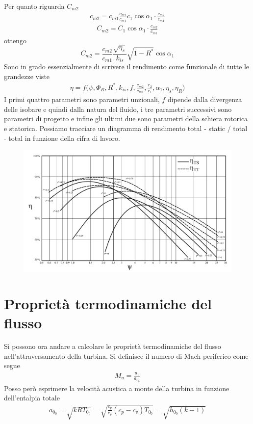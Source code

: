 Per quanto riguarda $C_{m2}$ 
\begin{align*}
c_{m2} = c_{m1} \frac{c_{m2}}{c_{m1}} c_1 \cos \alpha_1 \cdot \frac{c_{m2}}{c_{m1}}
\end{align*}
\begin{align*}
C_{m2} = C_1 \cos \alpha_1 \cdot \frac{c_{m2}}{c_{m1}}
\end{align*}
ottengo
\begin{equation}
\boxed{C_{m2} = \frac{c_{m2}}{c_{m1}} \frac{\sqrt{\eta_s}}{k_{is}} \sqrt{1 - R^*} \cos \alpha_1 }
\end{equation}
Sono in grado essenzialmente di scrivere il rendimento come funzionale di tutte le grandezze viste 
\begin{align*}
\eta = f \bigg( \psi, \Phi_R, R^*, k_{is}, f, \frac{c_{m2}}{c_{m1}}, \frac{r_2}{r_1}, \alpha_1, \eta_s, \eta_R \bigg)
\end{align*}
I primi quattro parametri sono parametri unzionali, $f$ dipende dalla divergenza delle isobare e quindi dalla natura del fluido, i tre parametri successivi sono parametri di progetto e infine gli ultimi due sono parametri della schiera rotorica e statorica.
Possiamo tracciare un diagramma di rendimento total - static / total - total in funzione della cifra di lavoro. 
\begin{figure}
\centering
  \includegraphics[width=.8\textwidth]{fig/Rendimenti_ts_tt.pdf}
\caption{}
\label{fig:Rendimenti_ts_tt}
\end{figure}
\section{Proprietà termodinamiche del flusso}
Si possono ora andare a calcolare le proprietà termodinamiche del flusso nell'attraversamento della turbina. Si definisce il numero di Mach periferico come segue
\begin{align*}
M_u = \frac{u_1}{a_{0_0}}
\end{align*}
Posso però esprimere la velocità acustica a monte della turbina in funzione dell'entalpia totale
\begin{align*}
a_{0_0} = \sqrt{kRT_{0_0}} = \sqrt{\frac{c_p}{c_v} \left( c_p - c_v \right) T_{0_0}} = \sqrt{h_{0_0} \left( k - 1 \right)}
\end{align*}

